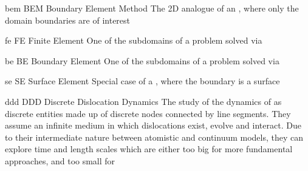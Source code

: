 \newdualentry
{bem}
{BEM}
{Boundary Element Method}
{The 2D analogue of an , where only the domain boundaries are of interest}

\newdualentry
{fe}
{FE}
{Finite Element}
{One of the subdomains of a problem solved via }

\newdualentry
{be}
{BE}
{Boundary Element}
{One of the subdomains of a problem solved via }

\newdualentry
{se}
{SE}
{Surface Element}
{Special case of a , where the boundary is a surface}

\newdualentry
{ddd}
{DDD}
{Discrete Dislocation Dynamics}
{The study of the dynamics of  as discrete entities made up of discrete nodes connected by line segments. They assume an infinite medium in which dislocations exist, evolve and interact. Due to their intermediate nature between atomistic and continuum models, they can explore time and length scales which are either too big for more fundamental approaches, and too small for }
